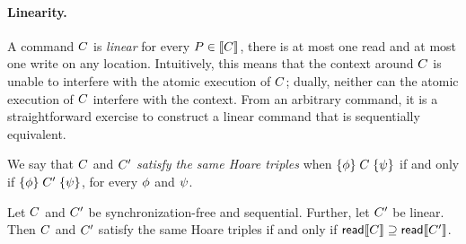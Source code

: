 \paragraph{Linearity.}
A command $C$ is \emph{linear} for every $P\in\llbracket C\rrbracket$, there is
at most one read and at most one write on any location.  Intuitively, this
means that the context around $C$ is unable to interfere with the atomic
execution of $C$; dually, neither can the atomic execution of $C$
interfere with the context.  From an arbitrary command, it is a
straightforward exercise to construct a linear command that is sequentially
equivalent.

We say that $C$ and $C'$ \emph{satisfy the same Hoare triples} when
$\{\phi\}\allowbreak\;C\;\allowbreak\{\psi\}$ if and only if
$\{\phi\}\allowbreak\;C'\;\allowbreak\{\psi\}$, for every $\phi$ and $\psi$.

\begin{corollary}\label{seqcompleteness}
  Let $C$ and $C'$ be synchronization-free and sequential.  Further,
  let $C'$ be linear.  Then $C$ and $C'$ satisfy the same Hoare
  triples if and only if $\mathsf{read}\llbracket C\rrbracket \supseteq \mathsf{read}\llbracket C'\rrbracket$.
%    
\end{corollary}

